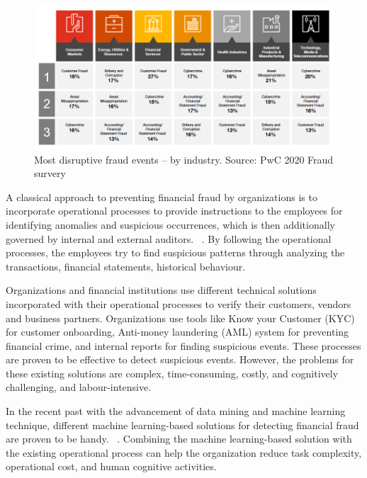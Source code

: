 \begin{figure}[htp]
    \centering
    \includegraphics[width=\linewidth]{figures/fraud_by_industry.PNG}
    \caption{Most disruptive fraud events – by industry. Source: PwC 2020 Fraud survery~\cite{PwC.Crime.Survey} }
    \label{fig:fraud_sector}
\end{figure}



A classical approach to preventing financial fraud by organizations is to incorporate operational processes to provide instructions to the employees for identifying anomalies and suspicious occurrences, which is then additionally governed by internal and external auditors. ~\cite{kassem_2014}. By following the operational processes, the employees try to find suspicious patterns through analyzing the transactions, financial statements, historical behaviour. 



Organizations and financial institutions use different technical solutions incorporated with their operational processes to verify their customers, vendors and business partners. Organizations use tools like Know your Customer (KYC) for customer onboarding, Anti-money laundering (AML) system for preventing financial crime, and internal reports for finding suspicious events. These processes are proven to be effective to detect suspicious events. However, the problems for these existing solutions are complex, time-consuming, costly, and cognitively challenging, and labour-intensive.


In the recent past with the advancement of data mining and machine learning technique, different machine learning-based solutions for detecting financial fraud are proven to be handy. ~\cite{RB2021, KIRKOS2007995}. Combining the machine learning-based solution with the existing operational process can help the organization reduce task complexity, operational cost, and human cognitive activities. 


